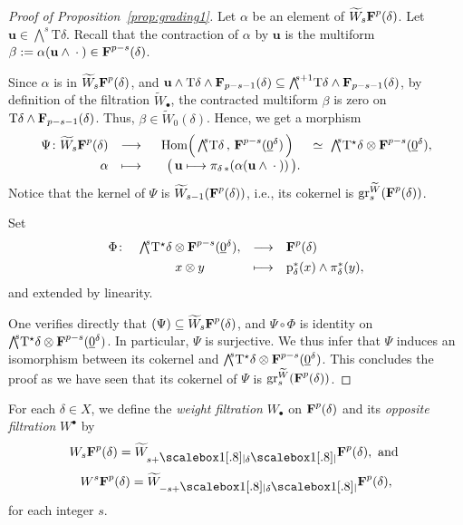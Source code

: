 \documentclass[11pt]{amsart}
\theoremstyle{definition}
\newenvironment{defi}
  {\pushQED{\qed}\renewcommand{\qedsymbol}{$\diamond$}\defii}
  {\popQED\enddefii}
\numberwithin{equation}{section}
\newcommand{\ie}{i.e.}
\renewcommand{\~}{\widetilde}
\newcommand{\bul}{\bullet} %
\let\oldbigwedge\bigwedge
\renewcommand{\bigwedge}{{\textstyle\oldbigwedge\!}}
\let\Im\relax
\DeclareMathOperator{\Im}{Im} %
\DeclareMathOperator{\Hom}{Hom} %
\DeclareMathOperator{\gr}{gr} %
\renewcommand{\u}{\mathbf u} %
\newcommand{\TT}{\mathrm{T}} %
\newcommand{\dual}{\star} %
\newcommand{\SF}{\textrm{\bf F}} %
\newcommand{\p}{{\rm p}} %
\newcommand{\dimsaux}[2]{\raisebox{.2ex}{\scalebox{1}[.8]{$#1\lvert$}}#2\raisebox{.2ex}{\scalebox{1}[.8]{$#1\rvert$}}}
\newcommand{\dims}[1]{\mathpalette\dimsaux{#1}}
\newcommand{\conezero}{{\underline0}} %
\begin{document}
\begin{proof}[Proof of Proposition~\ref{prop:grading1}]
Let $\alpha$ be an element of $\~W_s\SF^p(\delta)$. Let $\u\in \bigwedge^s\TT\delta$. Recall that the contraction of $\alpha$ by $\u$ is the multiform $\beta:=\alpha(\u\wedge {}\cdot{})\in \SF^{p-s}(\delta)$.

Since $\alpha$ is in $\~W_s\SF^p(\delta)$, and $ \u \wedge \TT\delta\wedge \SF_{p-s-1}(\delta) \subseteq \bigwedge^{s+1} \TT\delta\wedge \SF_{p-s-1}(\delta)$, by definition of the filtration $\~W_\bul$, the contracted multiform $\beta$ is zero on $\TT\delta\wedge \SF_{p-s-1}(\delta)$. Thus, $\beta\in\~W_0(\delta)$. Hence, we get a morphism
\[ \begin{array}{rrcl}
\Psi\colon \~W_s\SF^p(\delta) & \longrightarrow & \Hom\Bigl(\,\bigwedge^s\TT\delta\,,\, \SF^{p-s}(\conezero^\delta)\,\Bigr) &\simeq \,\,\bigwedge^s \TT^\dual\delta \otimes \SF^{p-s}(\conezero^\delta), \\[.4em]
\alpha  & \longmapsto &\quad\bigl(\,  \u \longmapsto \pi_{\delta\,*}(\alpha(\u \wedge {}\cdot{}))  \, \bigr).
\end{array} \]
Notice that the kernel of $\Psi$ is $\~W_{s-1}(\SF^p(\delta))$, \ie, its cokernel is $\gr^{\~W}_s(\SF^p(\delta))$.

Set
\[ \begin{array}{rccl}
\Phi\colon& \bigwedge^s \TT^\dual\delta \otimes \SF^{p-s}(\conezero^\delta), & \longrightarrow & \SF^p(\delta) \\[.4em]
& x \otimes y  & \longmapsto & \p_\delta^*(x)\wedge\pi_\delta^*(y),
\end{array} \]
and extended by linearity.

\medskip

One verifies directly that $\Im(\Psi)\subseteq\~W_s\SF^p(\delta)$, and $\Psi\circ\Phi$ is identity on $\bigwedge^s \TT^\dual\delta \otimes \SF^{p-s}(\conezero^\delta)$. In particular, $\Psi$ is surjective. We thus infer that $\Psi$ induces an isomorphism between its cokernel and $\bigwedge^s \TT^\dual\delta \otimes \SF^{p-s}(\conezero^\delta)$. This concludes the proof as we have seen that its cokernel of $\Psi$ is $\gr^{\~W}_s(\SF^p(\delta))$.
\end{proof}

\medskip

\begin{defi}[Weight filtration]
For each $\delta \in X$, we define the \emph{weight filtration} $W_\bul$ on $\SF^p(\delta)$ and its \emph{opposite filtration} $W^\bul$ by
\[ W_s \SF^p(\delta) = \~W_{s+\dims\delta}\SF^p(\delta), \textrm{ and }\]
\[W^s \SF^p(\delta) = \~ W_{-s+\dims{\delta}}\SF^p(\delta),\]
for each integer $s$.
\end{defi}
\end{document}

